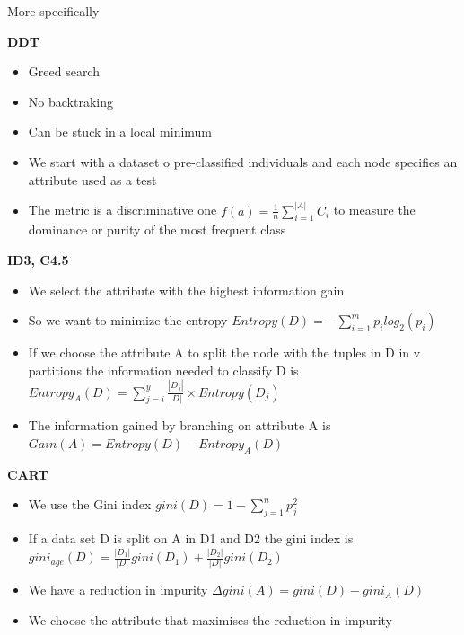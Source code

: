 More specifically

\vspace{10pt}

\textbf{DDT}
\begin{itemize}
    \item Greed search
    \item No backtraking
    \item Can be stuck in a local minimum
    \item We start with a dataset o pre-classified individuals and each node specifies an attribute used as a test
    \item The metric is a discriminative one $f(a) = \frac{1}{n} \sum_{i=1}^{|A|} C_i$ to measure the dominance or purity of the most frequent class
    
\end{itemize}

\vspace{10pt}

\textbf{ID3, C4.5}
\begin{itemize}
    \item We select the attribute with the highest information gain
    \item So we want to minimize the entropy $Entropy(D) = - \sum_{i=1}^{m} p_i log_2(p_i)$
    \item If we choose the attribute A to split the node with the tuples in D in v partitions the information needed to classify D is $ Entropy_A(D) = \sum_{j=i}^{y} \frac{|D_j|}{|D|} \times Entropy(D_j)$
    \item The information gained by branching on attribute A is $ Gain(A) = Entropy(D) - Entropy_A(D)$
\end{itemize}


\vspace{10pt}
\textbf{CART}

\begin{itemize}
    \item We use the Gini index $gini(D) = 1 - \sum_{j=1}^{n}p^2_j$
    \item If a data set D is split on A in D1 and D2 the gini index is $ gini_{age}(D) = \frac{|D_1|}{|D|} gini(D_1) + \frac{|D_2|}{|D|}gini(D_2)$
    \item We have a reduction in impurity $\Delta gini(A) = gini(D) - gini_A(D)$
    \item We choose the attribute that maximises the reduction in impurity
\end{itemize}

